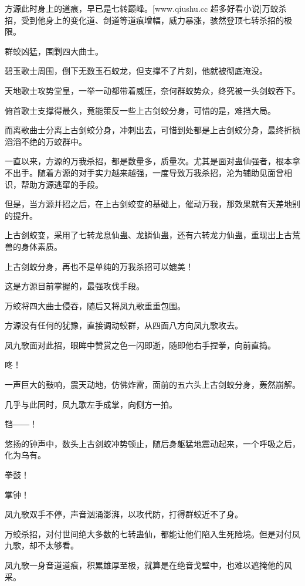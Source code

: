 
\begin{this_body}

方源此时身上的道痕，早已是七转巅峰。[www.qiushu.cc 超多好看小说]万蛟杀招，受到他身上的变化道、剑道等道痕增幅，威力暴涨，骇然登顶七转杀招的极限。

群蛟凶猛，围剿四大曲士。

碧玉歌士周围，倒下无数玉石蛟龙，但支撑不了片刻，他就被彻底淹没。

天地歌士攻势堂皇，一举一动都带着威压，奈何群蛟势众，终究被一头剑蛟吞下。

俯首歌士支撑得最久，竟能策反一些上古剑蛟分身，可惜的是，难挡大局。

而离歌曲士分离上古剑蛟分身，冲刺出去，可惜到处都是上古剑蛟分身，最终折损滔滔不绝的万蛟群中。

一直以来，方源的万我杀招，都是数量多，质量次。尤其是面对蛊仙强者，根本拿不出手。随着方源的对手实力越来越强，一度导致万我杀招，沦为辅助见面曾相识，帮助方源逃窜的手段。

但是，当方源并招之后，在上古剑蛟变的基础上，催动万我，那效果就有天差地别的提升。

上古剑蛟变，采用了七转龙息仙蛊、龙鳞仙蛊，还有六转龙力仙蛊，重现出上古荒兽的身体素质。

上古剑蛟分身，再也不是单纯的万我杀招可以媲美！

这是方源目前掌握的，最强攻伐手段。

万蛟将四大曲士侵吞，随后又将凤九歌重重包围。

方源没有任何的犹豫，直接调动蛟群，从四面八方向凤九歌攻去。

凤九歌面对此招，眼眸中赞赏之色一闪即逝，随即他右手捏拳，向前直捣。

咚！

一声巨大的鼓响，震天动地，仿佛炸雷，面前的五六头上古剑蛟分身，轰然崩解。

几乎与此同时，凤九歌左手成掌，向侧方一拍。

铛――！

悠扬的钟声中，数头上古剑蛟冲势顿止，随后身躯猛地震动起来，一个呼吸之后，化为乌有。

拳鼓！

掌钟！

凤九歌双手不停，声音汹涌澎湃，以攻代防，打得群蛟近不了身。

万蛟杀招，对付世间绝大多数的七转蛊仙，都能让他们陷入生死险境。但是对付凤九歌，却不太够看。

凤九歌一身音道道痕，积累雄厚至极，就算是在绝音戈壁中，也难以遮掩他的风采。


\end{this_body}
